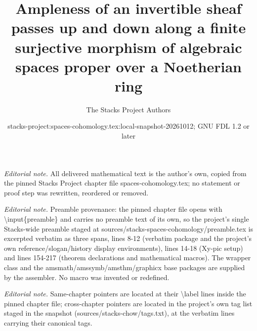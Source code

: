 \documentclass[10pt,a4paper]{amsart}
\title{Ampleness of an invertible sheaf passes up and down along a finite surjective morphism of algebraic spaces proper over a Noetherian ring}
\author{The Stacks Project Authors}
\date{stacks-project:spaces-cohomology.tex:local-snapshot-20261012; GNU FDL 1.2 or later}
\theoremstyle{plain}
\theoremstyle{definition}
\theoremstyle{remark}
\numberwithin{equation}{subsection}
\begin{document}
\maketitle
\noindent\textit{Editorial note.} All delivered mathematical text is the author's own, copied from the pinned Stacks Project chapter file spaces-cohomology.tex; no statement or proof step was rewritten, reordered or removed.\par\medskip
\noindent\textit{Editorial note.} Preamble provenance: the pinned chapter file opens with \textbackslash{}input\{preamble\} and carries no preamble text of its own, so the project's single Stacks-wide preamble staged at sources/stacks-spaces-cohomology/preamble.tex is excerpted verbatim as three spans, lines 8-12 (verbatim package and the project's own reference/slogan/history display environments), lines 14-18 (Xy-pic setup) and lines 154-217 (theorem declarations and mathematical macros). The wrapper class and the amsmath/amssymb/amsthm/graphicx base packages are supplied by the assembler. No macro was invented or redefined.\par\medskip
\noindent\textit{Editorial note.} Same-chapter pointers are located at their \textbackslash{}label lines inside the pinned chapter file; cross-chapter pointers are located in the project's own tag list staged in the snapshot (sources/stacks-chow/tags.txt), at the verbatim lines carrying their canonical tags.\par\medskip
\end{document}
